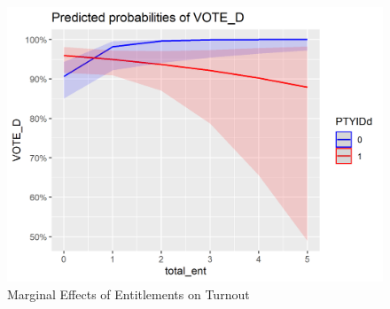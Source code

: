 \documentclass[12pt]{paper}
\begin{document}
\begin{figure}[H]
	\includegraphics[scale=0.7]{Figs/marginal.png} \centering
	\caption{Marginal Effects of Entitlements on Turnout}
	\label{}
\end{figure}
\end{document}
